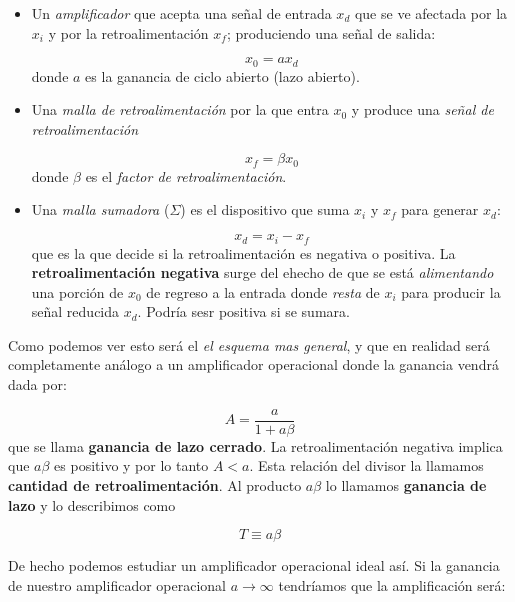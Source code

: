 \documentclass[12pt,a4paper]{article}
\numberwithin{equation}{section}
\numberwithin{figure}{section}
\begin{document}
\begin{itemize}
\item Un \textit{amplificador} que acepta una señal de entrada $x_d$ que se ve afectada por la $x_i$ y por la retroalimentación $x_f$; produciendo una señal de salida:

\begin{equation}
x_0 = a x_d
\end{equation}
donde $a$ es la ganancia de ciclo abierto (lazo abierto).

\item Una \textit{malla de retroalimentación} por la que entra $x_0$ y produce una \textit{señal de retroalimentación}

\begin{equation}
x_f = \beta x_0
\end{equation}
donde $\beta$ es el \textit{factor de retroalimentación}.

\item Una \textit{malla sumadora} ($\Sigma$) es el dispositivo que suma $x_i$ y $x_f$ para generar $x_d$: 

\begin{equation}
x_d = x_i - x_f
\end{equation}
que es la que decide si la retroalimentación es negativa o positiva. La \textbf{retroalimentación negativa} surge del ehecho de que se está \textit{alimentando} una porción de $x_0$ de regreso a la entrada donde \textit{resta} de $x_i$ para producir la señal reducida $x_d$. Podría sesr positiva si se sumara.
\end{itemize}

Como podemos ver esto será el \textit{el esquema mas general}, y que en realidad será completamente análogo a un amplificador operacional donde la ganancia vendrá dada por:

\begin{equation}
A = \dfrac{a}{1+ a \beta}
\end{equation}
que se llama \textbf{ganancia de lazo cerrado}. La retroalimentación negativa implica que $a \beta$  es positivo y por lo tanto $A<a$. Esta relación del divisor la llamamos \textbf{cantidad de retroalimentación}. Al producto $a\beta$ lo llamamos \textbf{ganancia de lazo} y lo describimos como

\begin{equation}
T \equiv a \beta
\end{equation}

De hecho podemos estudiar un amplificador operacional ideal así. Si la ganancia de nuestro amplificador operacional $a \rightarrow \infty$ tendríamos que la amplificación será:
\end{document}
